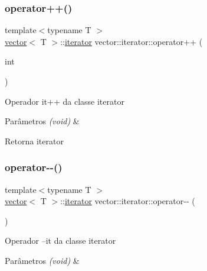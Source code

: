 \subsubsection{\texorpdfstring{operator++()}{operator++()}\hspace{0.1cm}{\footnotesize\ttfamily [2/2]}}
{\footnotesize\ttfamily template$<$typename T $>$ \\
\mbox{\hyperlink{classsc_1_1vector}{vector}}$<$ T $>$\+::\mbox{\hyperlink{classsc_1_1vector_1_1iterator}{iterator}} vector\+::iterator\+::operator++ (\begin{DoxyParamCaption}\item[{int}]{ }\end{DoxyParamCaption})}

Operador it++ da classe iterator 
\begin{DoxyParams}{Parâmetros}
{\em (void)} & \\
\hline
\end{DoxyParams}
\begin{DoxyReturn}{Retorna}
iterator 
\end{DoxyReturn}
\mbox{\label{classsc_1_1vector_1_1iterator_a92b5218f5e8445568fb8f82fee7bfe8e}} 
\subsubsection{\texorpdfstring{operator-\/-\/()}{operator--()}\hspace{0.1cm}{\footnotesize\ttfamily [1/2]}}
{\footnotesize\ttfamily template$<$typename T $>$ \\
\mbox{\hyperlink{classsc_1_1vector}{vector}}$<$ T $>$\+::\mbox{\hyperlink{classsc_1_1vector_1_1iterator}{iterator}} vector\+::iterator\+::operator-\/-\/ (\begin{DoxyParamCaption}{ }\end{DoxyParamCaption})}

Operador --it da classe iterator 
\begin{DoxyParams}{Parâmetros}
{\em (void)} & \\
\hline
\end{DoxyParams}
\mbox{\label{classsc_1_1vector_1_1iterator_a58cbdffc1cc240313c672f60ff7ded19}} 
